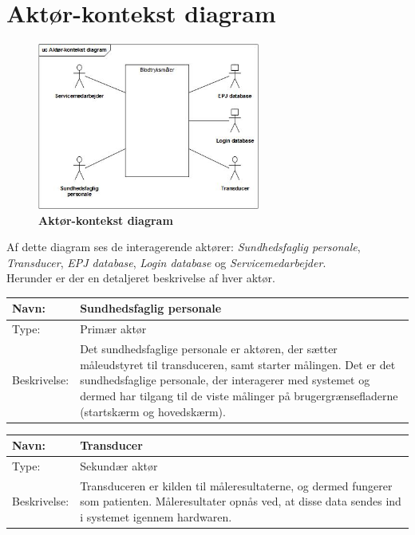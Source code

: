 \section{Aktør-kontekst diagram}
\begin{figure}[h!]
\includegraphics[width =0.65\textwidth , left]{billeder/Aktorkontekst.jpg}
\caption{\textbf{Aktør-kontekst diagram}}
\end{figure}

Af dette diagram ses de interagerende aktører: \textit{Sundhedsfaglig personale}, \textit{Transducer}, \textit{EPJ database}, \textit{Login database} og \textit{Servicemedarbejder}.\\ Herunder er der en detaljeret beskrivelse af hver aktør.

\begin{table}[h!]
\begin{tabular}{| >{\raggedright\arraybackslash}p{3cm} | >{\raggedright\arraybackslash}p{12cm} |}
   \hline
   Navn: & Sundhedsfaglig personale\\ \hline
   Type: & Primær aktør \\ \hline
   Beskrivelse: & Det sundhedsfaglige personale er aktøren, der sætter måleudstyret til transduceren, samt starter målingen. Det er det sundhedsfaglige personale, der interagerer med systemet og dermed har tilgang til de viste målinger på brugergrænsefladerne (startskærm og hovedskærm).\\ \hline
\end{tabular}
\end{table}


\begin{table}[h!]
\begin{tabular}{| >{\raggedright\arraybackslash}p{3cm} | >{\raggedright\arraybackslash}p{12cm} |}
   \hline
   Navn: & Transducer\\ \hline
   Type: & Sekundær aktør \\ \hline
   Beskrivelse: & Transduceren er kilden til måleresultaterne, og dermed fungerer som patienten. Måleresultater opnås ved, at disse data sendes ind i systemet igennem hardwaren.\\ \hline
\end{tabular}
\end{table}


